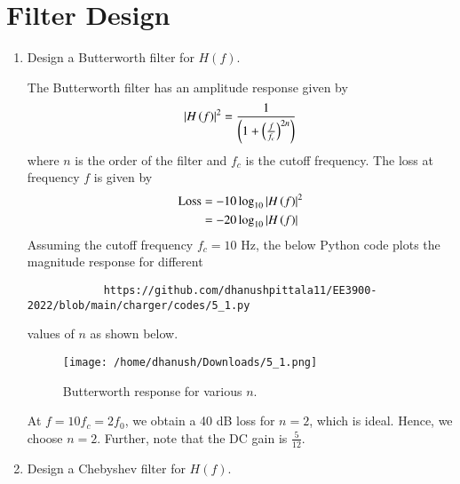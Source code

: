 \documentclass[journal,12pt,twocolumn]{IEEEtran}
\renewcommand\thesection{\arabic{section}}
\begin{document}
	\section{Filter Design}
	\begin{enumerate}[label=\thesection.\arabic*
		,ref=\thesection.\theenumi]
		\item Design a Butterworth filter for $H(f)$.
		
		\solution The Butterworth filter has an amplitude response
		given by
		\begin{align}
			\left\vert H\left(f\right)\right\vert^2 = \frac{1}{\left(1 + \left(\frac{f}{f_c}\right)^{2n}\right)}
		\end{align}
		where $n$ is the order of the filter and $f_c$ is the cutoff
		frequency. The loss at frequency $f$ is given by 
		\begin{align}
			\text{Loss} &= -10\log_{10}\left\vert H\left(f\right)\right\vert^2 \\
			&= -20\log_{10}\left\vert H\left(f\right)\right\vert
		\end{align}
		Assuming the cutoff frequency $f_c = 10$ Hz, the below Python code plots the magnitude response for different 
		\begin{lstlisting}
			https://github.com/dhanushpittala11/EE3900-2022/blob/main/charger/codes/5_1.py
		\end{lstlisting}
		values of $n$ as shown below.
		\begin{figure}[!ht]
			\texttt{[image: /home/dhanush/Downloads/5\_1.png]}
			\caption{Butterworth response for various $n$.}
			\label{fig:butter-resp}
		\end{figure}
		At $f = 10f_c = 2f_0$, we obtain a 40 dB loss for $n = 2$, which is
		ideal. Hence, we choose $n = 2$. Further, note that the
		DC gain is $\frac{5}{12}$.
		
		\item Design a Chebyshev filter for $H(f)$.
		

\end{enumerate}
\end{document}
